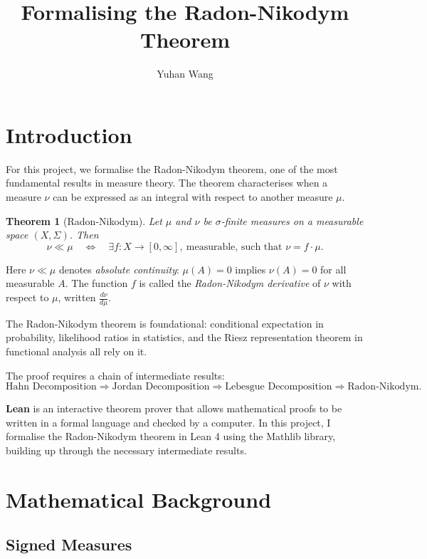 \documentclass[11pt]{article}
\title{Formalising the Radon-Nikodym Theorem}
\author{Yuhan Wang}
\date{}
\newtheorem{theorem}{Theorem}
\begin{document}
\maketitle

\section{Introduction}

For this project, we formalise the Radon-Nikodym theorem, one of the most fundamental results in measure theory. The theorem characterises when a measure $\nu$ can be expressed as an integral with respect to another measure $\mu$.

\begin{theorem}[Radon-Nikodym]
Let $\mu$ and $\nu$ be $\sigma$-finite measures on a measurable space $(X, \Sigma)$. Then
\[
\nu \ll \mu \quad\Longleftrightarrow\quad \exists f : X \to [0,\infty],\ \text{measurable, such that } \nu = f \cdot \mu.
\]
\end{theorem}

Here $\nu \ll \mu$ denotes \emph{absolute continuity}: $\mu(A) = 0$ implies $\nu(A) = 0$ for all measurable $A$. The function $f$ is called the \emph{Radon-Nikodym derivative} of $\nu$ with respect to $\mu$, written $\frac{d\nu}{d\mu}$.

The Radon-Nikodym theorem is foundational: conditional expectation in probability, likelihood ratios in statistics, and the Riesz representation theorem in functional analysis all rely on it.

The proof requires a chain of intermediate results:
\[
\text{Hahn Decomposition} \Rightarrow \text{Jordan Decomposition} \Rightarrow \text{Lebesgue Decomposition} \Rightarrow \text{Radon-Nikodym}.
\]

\textbf{Lean} is an interactive theorem prover that allows mathematical proofs to be written in a formal language and checked by a computer. In this project, I formalise the Radon-Nikodym theorem in Lean 4 using the Mathlib library, building up through the necessary intermediate results.

\section{Mathematical Background}

\subsection{Signed Measures}
\end{document}
